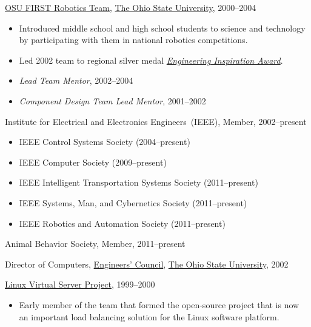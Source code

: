 \documentclass[10pt]{article}
\newenvironment{innerlist}[1][\enskip\textbullet]%
        {\begin{itemize}[#1,leftmargin=*,parsep=0pt,itemsep=0pt,topsep=0pt,partopsep=0pt]}
        {\end{itemize}}
\newcommand{\halfblankline}{\quad\vspace{-0.5\baselineskip}\pagebreak[3]}
\begin{document}
\halfblankline

\href{http://www.osufirst.org/}{OSU FIRST Robotics Team},
\href{http://www.osu.edu}{The Ohio State University}, 2000--2004
\begin{innerlist}
\item Introduced middle school and high school students to science and
        technology by participating with them in national robotics
        competitions.
\item Led 2002 team to regional silver medal
        \href{http://www.firstwiki.org/Engineering_Inspiration_Award}
             {\emph{Engineering Inspiration Award}}.
\item \emph{Lead Team Mentor}, 2002--2004
\item \emph{Component Design Team Lead Mentor}, 2001--2002
\end{innerlist}

\halfblankline

Institute for Electrical and Electronics Engineers~(IEEE), Member,
2002--present
%
\begin{innerlist}
\item IEEE Control Systems Society (2004--present)
\item IEEE Computer Society (2009--present)
\item IEEE Intelligent Transportation Systems Society (2011--present)
\item IEEE Systems, Man, and Cybernetics Society (2011--present)
\item IEEE Robotics and Automation Society (2011--present)
\end{innerlist}

\halfblankline

Animal Behavior Society, Member, 2011--present

\halfblankline

Director of Computers,
\href{http://ec.osu.edu/}{Engineers' Council},
\href{http://www.osu.edu/}{The Ohio State University}, 2002

\halfblankline

\href{http://www.linuxvirtualserver.org/}
     {Linux Virtual Server Project}, 1999--2000
\begin{innerlist}
\item Early member of the team that formed the open-source project that
        is now an important load balancing solution for the Linux
        software platform.
\end{innerlist}

\halfblankline
\end{document}
